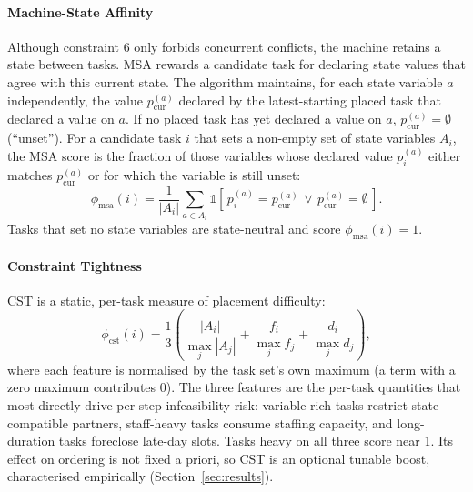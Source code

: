 \documentclass[conference]{IEEEtran}
\begin{document}
\paragraph{Machine-State Affinity}
Although constraint 6 only forbids concurrent conflicts, the machine
retains a state between tasks. MSA rewards a candidate task
for declaring state values that agree with this current state.
The algorithm maintains, for each state variable $a$ independently, the value
$p_{\text{cur}}^{(a)}$ declared by the latest-starting placed task
that declared a value on $a$. If no placed task has yet declared a value on $a$,
$p_{\text{cur}}^{(a)} = \emptyset$ (``unset''). For a candidate task $i$ that sets a non-empty set of
state variables $A_i$, the MSA score is the fraction of those variables whose
declared value $p_i^{(a)}$ either matches $p_{\text{cur}}^{(a)}$ or
for which the variable is still unset:
\begin{equation}
\phi_{\text{msa}}(i) =
\frac{1}{|A_i|} \sum_{a \in A_i}
\mathbb{1}\!\left[\, p_i^{(a)} = p_{\text{cur}}^{(a)} \,\lor\,
                       p_{\text{cur}}^{(a)} = \emptyset \,\right].
\end{equation}
Tasks that set no state variables are state-neutral and score
$\phi_{\text{msa}}(i) = 1$.

\paragraph{Constraint Tightness}
CST is a static, per-task measure of placement difficulty:
\begin{equation}
\phi_{\text{cst}}(i) = \frac{1}{3} \left(
  \frac{|A_i|}{\max_j |A_j|} +
  \frac{f_i}{\max_j f_j} +
  \frac{d_i}{\max_j d_j}
\right),
\end{equation}
where each feature is normalised by the task set's own maximum (a term with a zero maximum contributes 0). The
three features are the per-task quantities that most directly drive
per-step infeasibility risk: variable-rich tasks restrict
state-compatible partners, staff-heavy tasks consume staffing
capacity, and long-duration tasks foreclose late-day slots. Tasks
heavy on all three score near 1. Its effect on ordering is not fixed a priori, so CST is an optional
tunable boost, characterised empirically (Section~\ref{sec:results}).
\end{document}
